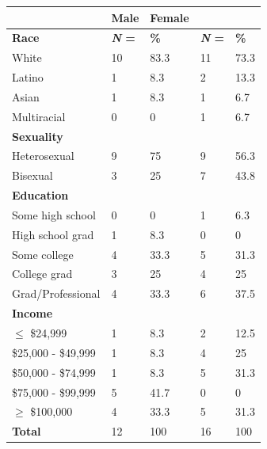 \begin{longtable}[]{@{}lllll@{}}
 \toprule
                     & \textbf{Male}              & \textbf{Female} &                     & \tabularnewline
 \midrule
 \endhead
 \textbf{Race}       & \textbf{\emph{N} =}        & \textbf{\%}     & \textbf{\emph{N} =}
                     & \textbf{\%}\tabularnewline
 White               & 10                         & 83.3            & 11                  & 73.3\tabularnewline
 Latino              & 1                          & 8.3             & 2                   & 13.3\tabularnewline
 Asian               & 1                          & 8.3             & 1                   & 6.7\tabularnewline
 Multiracial         & 0                          & 0               & 1                   & 6.7\tabularnewline
 \textbf{Sexuality}  &                            &                 &                     & \tabularnewline
 Heterosexual        & 9                          & 75              & 9                   & 56.3\tabularnewline
 Bisexual            & 3                          & 25              & 7                   & 43.8\tabularnewline
 \textbf{Education}  &                            &                 &                     & \tabularnewline
 Some high school    & 0                          & 0               & 1                   & 6.3\tabularnewline
 High school grad    & 1                          & 8.3             & 0                   & 0\tabularnewline
 Some college        & 4                          & 33.3            & 5                   & 31.3\tabularnewline
 College grad        & 3                          & 25              & 4                   & 25\tabularnewline
 Grad/Professional   & 4                          & 33.3            & 6                   & 37.5\tabularnewline
 \textbf{Income}     &                            &                 &                     & \tabularnewline
 $\leq$ \$24,999     & 1                          & 8.3             & 2                   & 12.5\tabularnewline
 \$25,000 - \$49,999 & 1                          & 8.3             & 4                   & 25\tabularnewline
 \$50,000 - \$74,999 & 1                          & 8.3             & 5                   & 31.3\tabularnewline
 \$75,000 - \$99,999 & 5                          & 41.7            & 0                   & 0\tabularnewline
 $\geq$ \$100,000    & 4                          & 33.3            & 5                   & 31.3\tabularnewline
 \textbf{Total}      & 12                         & 100             & 16                  & 100\tabularnewline
 \bottomrule
\end{longtable}

